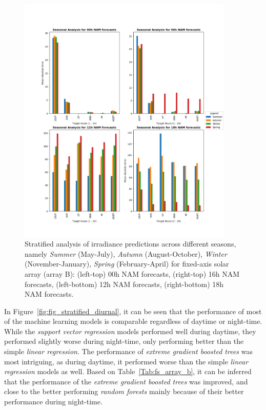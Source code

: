 \begin{figure}[ht]
    \begin{center}
    	\includegraphics[width=\textwidth, height=12cm]{chapter3/fig_seasonal_arrayb.png}
    	\caption[Stratified seasonal analysis of day-ahead irradiance predictions for fixed-axis array]{Stratified analysis of irradiance predictions across different seasons, namely \textit{Summer} (May-July), \textit{Autumn} (August-October), \textit{Winter} (November-January), \textit{Spring} (February-April) for fixed-axis solar array (array B): (left-top) 00h NAM forecasts, (right-top) 16h NAM forecasts, (left-bottom) 12h NAM forecasts, (right-bottom) 18h NAM forecasts.}
    	\label{fig:fig_stratified_seasonal}
    \end{center}
\end{figure}

\par In Figure~\ref{fig:fig_stratified_diurnal}, it can be seen that the performance of most of the machine learning models is comparable regardless of daytime or night-time. While the \textit{support vector regression} models performed well during daytime, they performed slightly worse during night-time, only performing better than the simple \textit{linear regression}. The performance of \textit{extreme gradient boosted trees} was most intriguing, as during daytime, it performed worse than the simple \textit{linear regression} models as well. Based on Table~\ref{Tab:fs_array_b}, it can be inferred that the performance of the \textit{extreme gradient boosted trees} was improved, and close to the better performing \textit{random forests} mainly because of their better performance during night-time.

